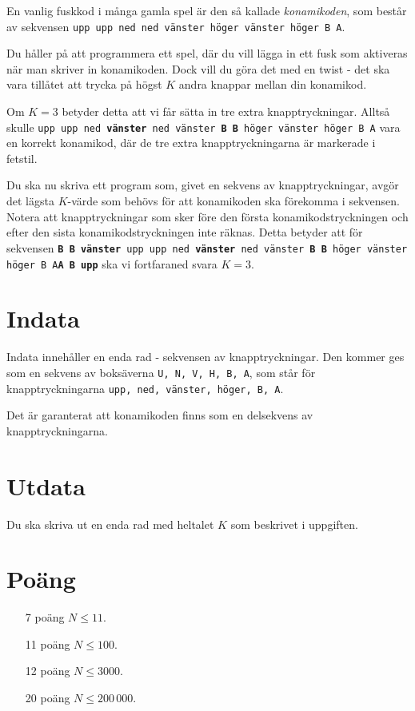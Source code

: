 
En vanlig fuskkod i många gamla spel är den så kallade \emph{konamikoden}, som består av sekvensen \texttt{upp upp ned ned vänster höger vänster höger B A}.

Du håller på att programmera ett spel, där du vill lägga in ett fusk som aktiveras när man skriver in konamikoden. Dock vill du göra det med en twist - det ska vara tillåtet att trycka på högst $K$ andra knappar mellan din konamikod.

Om $K = 3$ betyder detta att vi får sätta in tre extra knapptryckningar. Alltså skulle \texttt{upp upp ned \textbf{vänster} ned vänster \textbf{B B} höger vänster höger B A} vara en korrekt konamikod, där de tre extra knapptryckningarna är markerade i fetstil.

Du ska nu skriva ett program som, givet en sekvens av knapptryckningar, avgör det lägsta $K$-värde som behövs för att konamikoden ska förekomma i sekvensen. Notera att knapptryckningar som sker före den första konamikodstryckningen och efter den sista konamikodstryckningen inte räknas. Detta betyder att för sekvensen \texttt{\textbf{B B vänster} upp upp ned \textbf{vänster} ned vänster \textbf{B B} höger vänster höger B A\textbf{A B upp}} ska vi fortfaraned svara $K = 3$.

\section*{Indata}
Indata innehåller en enda rad - sekvensen av knapptryckningar. Den kommer ges som en sekvens av boksäverna \texttt{U, N, V, H, B, A}, som står för knapptryckningarna \texttt{upp, ned, vänster, höger, B, A}.

Det är garanterat att konamikoden finns som en delsekvens av knapptryckningarna.

\section*{Utdata}
Du ska skriva ut en enda rad med heltalet $K$ som beskrivet i uppgiften.

\section*{Poäng}

\begin{enumerate}
	\item[7 poäng] $N \le 11$.
	\item[11 poäng] $N \le 100$.
	\item[12 poäng] $N \le 3000$.
	\item[20 poäng] $N \le 200\,000$.
\end{enumerate}
